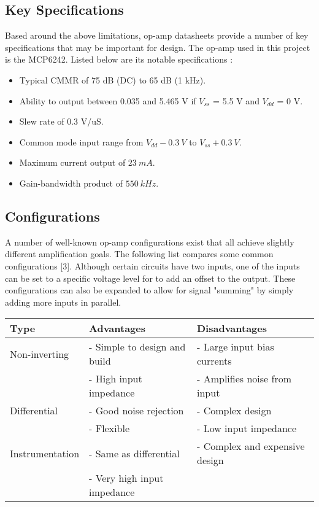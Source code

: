 \subsection{Key Specifications}
Based around the above limitations, op-amp datasheets provide a number of key specifications that may be important for design.
The op-amp used in this project is the MCP6242. Listed below are its notable specifications \cite{datasheetMCP6242}:
\begin{itemize}
    \item Typical CMMR of 75 dB (DC) to 65 dB (1 kHz).
    \item Ability to output between 0.035 and 5.465 V if $V_{ss}$ = 5.5 V and $V_{dd}$ = 0 V.
    \item Slew rate of 0.3 V/uS.
    \item Common mode input range from $V_{dd} - \SI{0.3}{V}$ to $V_{ss} + \SI{0.3}{V}$.
    \item Maximum current output of $\SI{23}{mA}$.
    \item Gain-bandwidth product of $\SI{550}{kHz}$.
\end{itemize}

\subsection{Configurations}
A number of well-known op-amp configurations exist that all achieve slightly different amplification goals. The following list compares some common configurations [3].
Although certain circuits have two inputs, one of the inputs can be set to a specific voltage level for to add an offset to the output. These configurations can also
be expanded to allow for signal "summing" by simply adding more inputs in parallel.


\begin{center}

    \begin{tabular}{|p{3.5cm}|p{6cm}|p{6cm}|}
        \hline
        Type            & Advantages
                               & Disadvantages                               \\
        \hline
        Non-inverting   & - Simple to design and build                    & - Large input bias currents                 \\
                        & - High input impedance                          & - Amplifies noise from input                \\
        \hline
        Differential    & - Good noise rejection                          & - Complex design                            \\
                        & - Flexible                                      & - Low input impedance                       \\
        \hline
        Instrumentation & - Same as differential                          & - Complex and expensive design              \\
                        & - Very high input impedance                     &                                             \\
        \hline
    \end{tabular}
\end{center}


